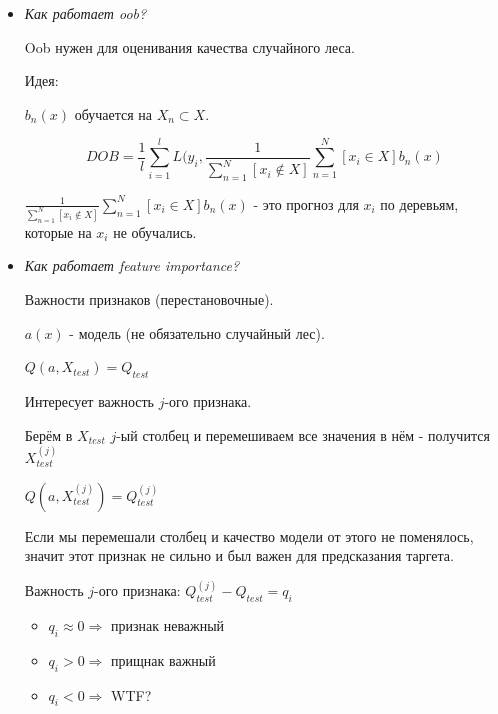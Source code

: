 \documentclass[a4paper]{article}
\begin{document}
\begin{itemize}
\item \textit{Как работает oob?}

Oob нужен для оценивания качества случайного леса.

Идея:

$b_n(x)$ обучается на $X_n \subset X$.

\[ DOB = \frac{1}{l} \sum_{i=1}^l L(y_i, \frac{1}{\sum_{n=1}^N [x_i \not\in X]} \sum_{n=1}^N [x_i \in X] b_n(x) \]

$\frac{1}{\sum_{n=1}^N [x_i \not\in X]} \sum_{n=1}^N [x_i \in X] b_n(x)$ - это прогноз для $x_i$ по деревьям, которые на $x_i$ не обучались.

\item \textit{Как работает feature importance?}

Важности признаков (перестановочные).

$a(x)$ - модель (не обязательно случайный лес).

$Q(a, X_{test}) = Q_{test}$

Интересует важность $j$-ого признака.

Берём в $X_{test}$ $j$-ый столбец и перемешиваем все значения в нём - получится $X_{test}^{(j)}$

$Q(a, X_{test}^{(j)}) = Q_{test}^{(j)}$

Если мы перемешали столбец и качество модели от этого не поменялось, значит этот признак не сильно и был важен для предсказания таргета.

Важность $j$-ого признака: $Q_{test}^{(j)} - Q_{test} = q_i$

\begin{itemize}

\item $q_i \approx 0 \Rightarrow$ признак неважный

\item $q_i > 0 \Rightarrow$ прищнак важный

\item $q_i < 0 \Rightarrow $ WTF?
\end{itemize}
\end{itemize}
\end{document}
